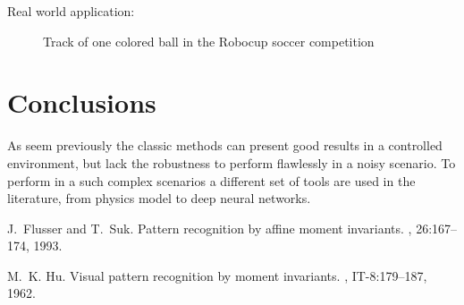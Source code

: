 \documentclass{sciposter}
\begin{document}
\begin{multicols}{3}
Real world application:

\begin{figure}[!h]
	\centering
			\setlength{\fboxsep}{1pt}
			\setlength{\fboxrule}{1pt}
	\caption{Track of one colored ball in the Robocup soccer competition}
	\label{fig:robocup_1}
\end{figure}

\section{Conclusions}

As seem previously the classic methods can present good results in a controlled environment, but lack the robustness to perform flawlessly in a noisy scenario. To perform in a such complex scenarios a different set of tools are used in the literature, from physics model to deep neural networks.




\begin{thebibliography}{1}

J.~Flusser and T.~Suk.
\newblock Pattern recognition by affine moment invariants.
, 26:167--174, 1993.

M.~K. Hu.
\newblock Visual pattern recognition by moment invariants.
, IT-8:179--187, 1962.


\end{thebibliography}
\end{multicols}
\end{document}
